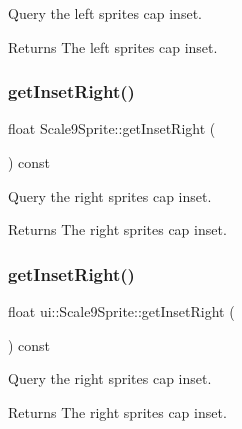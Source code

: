Query the left sprite\textquotesingle{}s cap inset. 

\begin{DoxyReturn}{Returns}
The left sprite\textquotesingle{}s cap inset. 
\end{DoxyReturn}
\mbox{\label{classui_1_1Scale9Sprite_ad31142787308264a812f7c204dab97f0}} 
\subsubsection{\texorpdfstring{get\+Inset\+Right()}{getInsetRight()}\hspace{0.1cm}{\footnotesize\ttfamily [1/2]}}
{\footnotesize\ttfamily float Scale9\+Sprite\+::get\+Inset\+Right (\begin{DoxyParamCaption}{ }\end{DoxyParamCaption}) const}



Query the right sprite\textquotesingle{}s cap inset. 

\begin{DoxyReturn}{Returns}
The right sprite\textquotesingle{}s cap inset. 
\end{DoxyReturn}
\mbox{\label{classui_1_1Scale9Sprite_a598b4d64677b29bea474ff7ba563d044}} 
\subsubsection{\texorpdfstring{get\+Inset\+Right()}{getInsetRight()}\hspace{0.1cm}{\footnotesize\ttfamily [2/2]}}
{\footnotesize\ttfamily float ui\+::\+Scale9\+Sprite\+::get\+Inset\+Right (\begin{DoxyParamCaption}{ }\end{DoxyParamCaption}) const}



Query the right sprite\textquotesingle{}s cap inset. 

\begin{DoxyReturn}{Returns}
The right sprite\textquotesingle{}s cap inset. 
\end{DoxyReturn}
\mbox{\label{classui_1_1Scale9Sprite_a1e67b994f74f374826d160290ff432d4}} 
